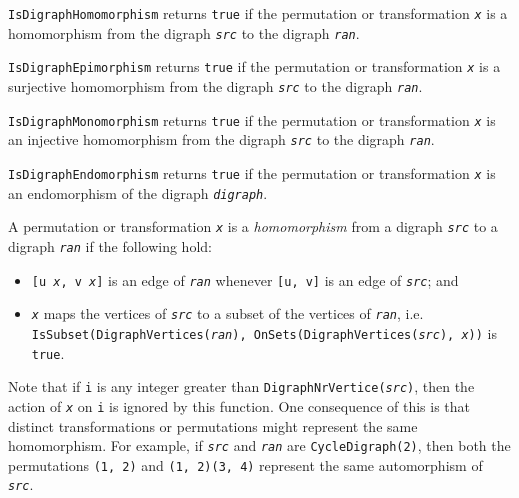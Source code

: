 \documentclass[a4paper,11pt]{report}
\begin{document}
{{{ \texttt{IsDigraphHomomorphism} returns \texttt{true} if the permutation or transformation \mbox{\texttt{\mdseries\slshape x}} is a homomorphism from the digraph \mbox{\texttt{\mdseries\slshape src}} to the digraph \mbox{\texttt{\mdseries\slshape ran}}. 

 \texttt{IsDigraphEpimorphism} returns \texttt{true} if the permutation or transformation \mbox{\texttt{\mdseries\slshape x}} is a surjective homomorphism from the digraph \mbox{\texttt{\mdseries\slshape src}} to the digraph \mbox{\texttt{\mdseries\slshape ran}}. 

 \texttt{IsDigraphMonomorphism} returns \texttt{true} if the permutation or transformation \mbox{\texttt{\mdseries\slshape x}} is an injective homomorphism from the digraph \mbox{\texttt{\mdseries\slshape src}} to the digraph \mbox{\texttt{\mdseries\slshape ran}}. 

 \texttt{IsDigraphEndomorphism} returns \texttt{true} if the permutation or transformation \mbox{\texttt{\mdseries\slshape x}} is an endomorphism of the digraph \mbox{\texttt{\mdseries\slshape digraph}}. 

 A permutation or transformation \mbox{\texttt{\mdseries\slshape x}} is a \emph{homomorphism} from a digraph \mbox{\texttt{\mdseries\slshape src}} to a digraph \mbox{\texttt{\mdseries\slshape ran}} if the following hold: 
\begin{itemize}
\item  \texttt{[u \texttt{} \mbox{\texttt{\mdseries\slshape x}}, v \texttt{} \mbox{\texttt{\mdseries\slshape x}}]} is an edge of \mbox{\texttt{\mdseries\slshape ran}} whenever \texttt{[u, v]} is an edge of \mbox{\texttt{\mdseries\slshape src}}; and 
\item  \mbox{\texttt{\mdseries\slshape x}} maps the vertices of \mbox{\texttt{\mdseries\slshape src}} to a subset of the vertices of \mbox{\texttt{\mdseries\slshape ran}}, i.e. \texttt{IsSubset(DigraphVertices(\mbox{\texttt{\mdseries\slshape ran}}), OnSets(DigraphVertices(\mbox{\texttt{\mdseries\slshape src}}), \mbox{\texttt{\mdseries\slshape x}}))} is \texttt{true}. 
\end{itemize}
 Note that if \texttt{i} is any integer greater than \texttt{DigraphNrVertice(\mbox{\texttt{\mdseries\slshape src}})}, then the action of \mbox{\texttt{\mdseries\slshape x}} on \texttt{i} is ignored by this function. One consequence of this is that distinct
transformations or permutations might represent the same homomorphism. For
example, if \mbox{\texttt{\mdseries\slshape src}} and \mbox{\texttt{\mdseries\slshape ran}} are \texttt{CycleDigraph(2)}, then both the permutations \texttt{(1, 2)} and \texttt{(1, 2)(3, 4)} represent the same automorphism of \mbox{\texttt{\mdseries\slshape src}}. 

}}}
\end{document}
